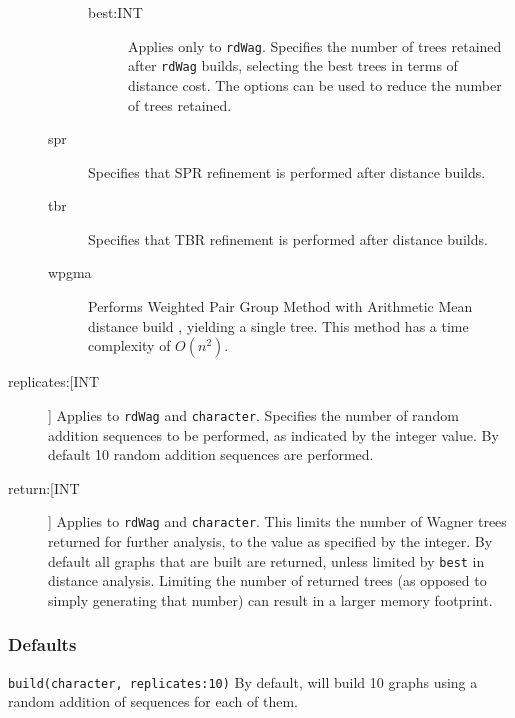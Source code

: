 \begin{description}
\begin{description}
			\begin{description}
				
				\item[best:INT] Applies only to \texttt{rdWag}. Specifies the number of trees 
				retained after \texttt{rdWag} builds, selecting the best trees in terms of distance 
				cost. The options can be used to reduce the number of trees retained.  
				
			\end{description}
			
			\item[spr] Specifies that SPR refinement \citep{Dayhoff1969} is performed 
			after distance builds.

			\item[tbr] Specifies that TBR refinement \citep{Farris1988, swofford1990a} 
			is performed after distance builds.
		
			\item[wpgma] Performs Weighted Pair Group Method with Arithmetic Mean 
			distance build \citep{SokalandMichener1958}, yielding a single tree. This method 
			has a time complexity of $O(n^2)$.
			
		\end{description}

		\item [replicates:[INT]] Applies to \texttt{rdWag} and \texttt{character}. Specifies the 
		number of random addition sequences to be performed, as indicated by the integer 
		value. By default 10 random addition sequences are performed.
		
		\item[return:[INT]] Applies to \texttt{rdWag} and \texttt{character}. This limits the 
		number of Wagner trees returned for further analysis, to the value as specified 
		by the integer. By default all graphs that are built are returned, unless limited 
		by \texttt{best} in distance analysis. Limiting the number of returned trees 
		(as opposed to simply generating that number) can result in a larger memory 
		footprint.
			
	\end{description}		

	\subsubsection{Defaults}
		\texttt{build(character, replicates:10)} By default, \phyg will build 10 graphs using 
		a random addition of sequences for each of them.
		
